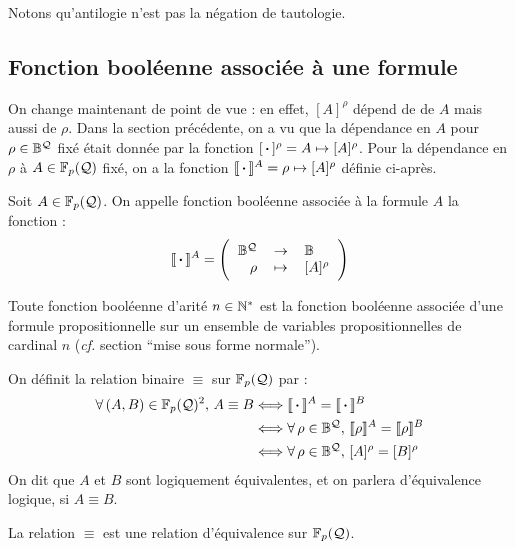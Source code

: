 		\begin{Remarque}
			Notons qu'antilogie n'est pas la négation de tautologie.
		\end{Remarque}
		
	\subsection{Fonction booléenne associée à une formule}
	
		On change maintenant de point de vue : en effet, \([A]^\rho\) dépend de de \(A\) mais aussi de \(\rho\). Dans la section précédente, on a vu que la dépendance en \(A\) pour \(\rho \in \bb{B}^\cal{Q}\) fixé était donnée par la fonction \([\text{\! \bdot \!}]^\rho = A \mapsto [A]^\rho\). \nt
		Pour la dépendance en \(\rho\) à \(A \in \FpQ\) fixé, on a la fonction \(\llbracket\text{\! \bdot \!}\rrbracket^A = \rho \mapsto [A]^\rho\) définie ci-après.
		
		\eqskip{3mm}
		\pagebreak
		\begin{Definition}
			Soit \(A \in \FpQ\).
			On appelle fonction booléenne associée à la formule \(A\) la fonction :
				\setlength{\tabcolsep}{2.2pt}
				\[
					\llbracket\text{\! \bdot \!}\rrbracket^A = \left( \begin{tabular}[h]{rcl}
						\(\bb{B}^\cal{Q}\) & \(\rightarrow\) & \(\bb{B}\) \\
						\(\rho\) & \(\mapsto\) & \([A]^\rho\)
					\end{tabular} \right)
				\]
		\end{Definition}
		
		\begin{Remarque}
			Toute fonction booléenne d'arité \(n \in \bb{N}^*\) est la fonction booléenne associée d'une formule propositionnelle sur un ensemble de variables propositionnelles de cardinal \(n\) (\emph{cf.} section ``mise sous forme normale'').
		\end{Remarque}
		
		\eqskip{2mm}
		\begin{Definition}
			On définit la relation binaire \(\equiv\) sur \(\FpQ\) par :
				\begin{align*}
					\forall \, (A,B) \in \FpQ^2, \, A \equiv B & \Longleftrightarrow \llbracket\text{\! \bdot \!}\rrbracket^A = \llbracket\text{\! \bdot \!}\rrbracket^B \\
					& \Longleftrightarrow \forall \, \rho \in \bb{B}^\cal{Q}, \, \llbracket \rho \rrbracket^A = \llbracket \rho \rrbracket^B \\
					& \Longleftrightarrow \forall \, \rho \in \bb{B}^\cal{Q}, \, [A]^\rho = [B]^\rho
				\end{align*}
			On dit que \(A\) et \(B\) sont logiquement équivalentes, et on parlera d'équivalence logique, si \(A \equiv B\).
		\end{Definition}
		 La relation \(\equiv\) est une relation d'équivalence sur \(\FpQ\). \nll
		
